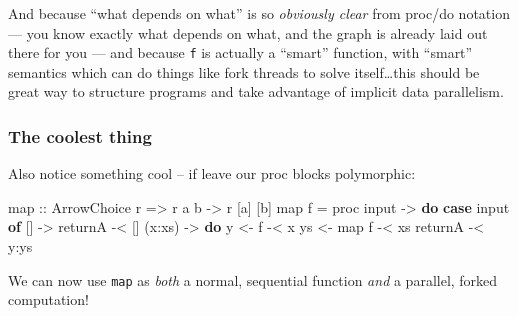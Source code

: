 \documentclass[]{article}
\newenvironment{Shaded}{}{}
\newcommand{\DataTypeTok}[1]{\textcolor[rgb]{0.56,0.13,0.00}{#1}}
\newcommand{\DecValTok}[1]{\textcolor[rgb]{0.25,0.63,0.44}{#1}}
\newcommand{\KeywordTok}[1]{\textcolor[rgb]{0.00,0.44,0.13}{\textbf{#1}}}
\newcommand{\NormalTok}[1]{#1}
\newcommand{\OperatorTok}[1]{\textcolor[rgb]{0.40,0.40,0.40}{#1}}
\newcommand{\OtherTok}[1]{\textcolor[rgb]{0.00,0.44,0.13}{#1}}
\begin{document}
And because ``what depends on what'' is so \emph{obviously clear} from proc/do
notation --- you know exactly what depends on what, and the graph is already
laid out there for you --- and because \texttt{f} is actually a ``smart''
function, with ``smart'' semantics which can do things like fork threads to
solve itself\ldots this should be great way to structure programs and take
advantage of implicit data parallelism.

\hypertarget{the-coolest-thing}{%
\subsubsection{The coolest thing}\label{the-coolest-thing}}

Also notice something cool -- if leave our proc blocks polymorphic:

\begin{Shaded}
\begin{Highlighting}[]
\OtherTok{map\textquotesingle{} ::} \DataTypeTok{ArrowChoice}\NormalTok{ r }\OtherTok{=>}\NormalTok{ r a b }\OtherTok{{-}>}\NormalTok{ r [a] [b]}
\NormalTok{map\textquotesingle{} f }\OtherTok{=}\NormalTok{ proc input }\OtherTok{{-}>} \KeywordTok{do}
    \KeywordTok{case}\NormalTok{ input }\KeywordTok{of}
\NormalTok{      []     }\OtherTok{{-}>}
\NormalTok{          returnA        }\OperatorTok{{-}<}\NormalTok{ []}
\NormalTok{      (x}\OperatorTok{:}\NormalTok{xs) }\OtherTok{{-}>} \KeywordTok{do}
\NormalTok{          y  }\OtherTok{<{-}}\NormalTok{ f        }\OperatorTok{{-}<}\NormalTok{ x}
\NormalTok{          ys }\OtherTok{<{-}}\NormalTok{ map\textquotesingle{} f   }\OperatorTok{{-}<}\NormalTok{ xs}
\NormalTok{          returnA        }\OperatorTok{{-}<}\NormalTok{ y}\OperatorTok{:}\NormalTok{ys}
\end{Highlighting}
\end{Shaded}

We can now use \texttt{map\textquotesingle{}} as \emph{both} a normal,
sequential function \emph{and} a parallel, forked computation!

\begin{Shaded}
\end{Shaded}
\end{document}
